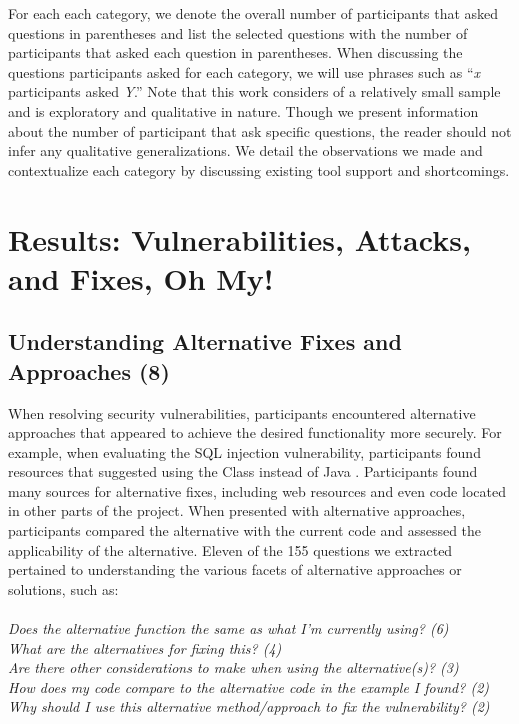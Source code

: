 \documentclass[conference]{IEEEtran}
\begin{document}
For each each category, we denote the overall number of participants that asked questions in parentheses and list the selected questions with the number of participants that asked each question in parentheses. 
When discussing the questions participants asked for each category, we will use phrases such as ``\emph{x} participants asked \emph{Y}.''
Note that this work considers of a relatively small sample and is exploratory and qualitative in nature.
Though we present information about the number of participant that ask specific questions, the reader should not infer any qualitative generalizations.
We detail the observations we made and contextualize each category by discussing existing tool support and shortcomings.

\section{Results: Vulnerabilities, Attacks, and Fixes, Oh My!}
\label{sec:results-vaf}



\noindent\subsection{\textbf{Understanding Alternative Fixes and Approaches (8)}}\label{uafa}

When resolving security vulnerabilities, participants encountered alternative approaches that appeared to achieve the desired functionality more securely.
For example, when evaluating the SQL injection vulnerability, participants found resources that suggested using the  Class instead of Java . 
Participants found many sources for alternative fixes, including web resources and even code located in other parts of the project.
When presented with alternative approaches, participants compared the alternative with the current code and assessed the applicability of the alternative. 
Eleven of the 155 questions we extracted pertained to understanding the various facets of alternative approaches or solutions, such as:
\\
\\
\noindent\emph{Does the alternative function the same as what I'm currently using? (6)} \\
\emph{What are the alternatives for fixing this? (4)} \\
\emph{Are there other considerations to make when using the alternative(s)? (3)} \\
\emph{How does my code compare to the alternative code in the example I found? (2)}
\emph{Why should I use this alternative method/approach to fix the vulnerability? (2)} \\
\end{document}

